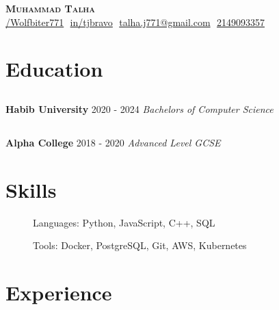 \documentclass{article}%
\begin{document}
%
\normalsize%
\vspace{-10mm}%

    \begin{description}
    \item 
        \begin{center}
            \textbf{\Huge \scshape Muhammad Talha} \\ \vspace{8pt}
            \small 
            {\underline{/Wolfbiter771}} $  $
            {\underline{in/tjbravo}} $  $
            {\underline{talha.j771@gmail.com}} $  $
            {\underline{2149093357}}
        \end{center}
    \end{description}
\section*{Education}%
\label{sec:Education}%

%
\subsection*{}%
\label{subsec:}%
\vspace{-4mm}%
\noindent%
\textbf{Habib University}%
\hfill%
2020 - 2024%
 \newline%
%
\textit{Bachelors of Computer Science}

%
\subsection*{}%
\label{subsec:}%
\vspace{-4mm}%
\noindent%
\textbf{Alpha College}%
\hfill%
2018 - 2020%
 \newline%
%
\textit{Advanced Level GCSE}

%
\section{Skills}%
\label{sec:Skills}%
\begin{description}%
\item[]%
Languages: Python, JavaScript, C++, SQL%
\item[]%
Tools: Docker, PostgreSQL, Git, AWS, Kubernetes%
\end{description}

%
\section*{Experience}%
\label{sec:Experience}%
\end{document}
